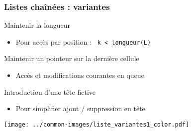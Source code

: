 \documentclass[table,handout,tikz,12pt,svgnames]{beamer}
\subtitle{\LARGE Listes chaînées : variantes}
\date{CM6}
\begin{document}
\begin{frame}
	\titlepage
\end{frame}

\begin{frame}[fragile=singleslide]
	\frametitle{Listes chaînées : variantes}
		\begin{block}{Maintenir la longueur}
			\begin{itemize}
				\item Pour accès par position : \texttt{ k < longueur(L)}
			\end{itemize}
		\end{block}
		\begin{block}{Maintenir un pointeur sur la dernière cellule}
			\begin{itemize}
				\item Accès et modifications courantes en queue
			\end{itemize}
		\end{block}
		\begin{block}{Introduction d'une tête fictive}
			\begin{itemize}
				\item Pour simplifier ajout / suppression en tête
			\end{itemize}
		\end{block}
	\begin{center}
			{\texttt{[image: ../common-images/liste\_variantes1\_color.pdf]}}
	\end{center}
\end{frame}
\end{document}

